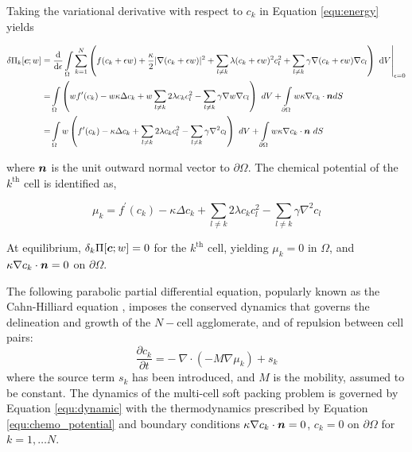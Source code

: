 \documentclass[idxtotoc,hyperref,openany]{labbook} %
\def\bc{\mbox{\boldmath$ c$}}
\def\bn{\mbox{\boldmath$ n$}}
\begin{document}
Taking the variational derivative with respect to $c_k$ in Equation \eqref{equ:energy} yields

\begin{align}
\delta \Pi_k[\bc;w] =  & \left.\frac{\text{d}}{\text{d}\epsilon} \int\limits_{\Omega} \sum_{k=1}^{N} \left(f(c_k+\epsilon w) + \frac{\kappa}{2}\vert\nabla (c_k+\epsilon w)\vert^2+ \sum_{l\ne k}\lambda (c_k+\epsilon w)^2 c_l^2 + \sum_{l\ne k}\gamma \nabla(c_k+\epsilon w) \nabla c_l \right)  ~\text{d}V \right|_{\epsilon=0} \nonumber\\
=&\int\limits_{\Omega} \left(w f^\prime(c_k) - w \kappa \Delta  c_k  + w \sum_{l\ne k}2\lambda  c_k c_l^2 - \sum_{l\ne k}\gamma\nabla w \nabla c_l \right) ~dV + \int\limits_{\partial \Omega}   w \kappa \nabla c_k \cdot \bn dS \nonumber\\
=&\int\limits_{\Omega} w \left( f^\prime(c_k) -  \kappa \Delta  c_k  +  \sum_{l\ne k}2\lambda  c_k c_l^2 - \sum_{l\ne k}\gamma\nabla^{2} c_l \right) ~dV + \int\limits_{\partial \Omega}   w \kappa \nabla c_k \cdot \bn   ~dS
\end{align} 

where $\bn$ is the unit outward normal vector to $\partial \Omega$. The chemical potential of the $k^\text{th}$ cell is identified as, 

\begin{equation}
\mu_k  = f^\prime(c_k) -  \kappa \Delta c_k + \sum_{l\ne k}2\lambda  c_k c_l^2 - \sum_{l\ne k}\gamma\nabla^{2} c_l 
\label{equ:chemo_potential}
\end{equation}

At equilibrium, $\delta_k \Pi[\bc;w] =0$ for the $k^\text{th}$ cell, yielding $\mu_k = 0$ in $\Omega$, and $\kappa \nabla c_k \cdot \bn = 0$ on $\partial \Omega$. 

The following parabolic partial differential equation, popularly known as the Cahn-Hilliard equation \cite{Cahn1958}, imposes the conserved dynamics that governs the delineation and growth of the $N-$cell agglomerate, and of repulsion between cell pairs:
\begin{equation}
\frac{\partial c_k}{\partial t} = -~\nabla \cdot (-M\nabla \mu_k) + s_k
\label{equ:dynamic}
\end{equation}
where the source term $s_k$ has been introduced, and $M$ is the mobility, assumed to be constant. The dynamics of the multi-cell soft packing problem is governed by Equation \eqref{equ:dynamic} with the thermodynamics prescribed by Equation \eqref{equ:chemo_potential} and boundary conditions $\kappa \nabla c_k \cdot \bn = 0$, $c_k=0$ on $\partial\Omega$ for $k = 1,\dots N$.
\end{document}
